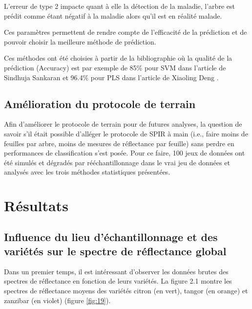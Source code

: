\documentclass[
  11pt,
  french,
  a4paper,
  extrafontsizes,onecolumn,openright
  ]{memoir}
\begin{document}
L'erreur de type 2 impacte quant à elle la détection de la maladie, l'arbre est prédit comme étant négatif à la maladie alors qu'il est en réalité malade.

Ces paramètres permettent de rendre compte de l'efficacité de la prédiction et de pouvoir choisir la meilleure méthode de prédiction.

Ces méthodes ont été choisies à partir de la bibliographie où la qualité de la prédiction (Accuracy) est par exemple de 85\% pour SVM dans l'article de Sindhuja Sankaran \autocite{sankaran_huanglongbing_2013} et 96.4\% pour PLS dans l'article de Xiaoling Deng \autocite{deng_detection_2020}.

\hypertarget{amuxe9lioration-du-protocole-de-terrain}{%
\section{Amélioration du protocole de terrain}\label{amuxe9lioration-du-protocole-de-terrain}}

Afin d'améliorer le protocole de terrain pour de futures analyses, la question de savoir s'il était possible d'alléger le protocole de SPIR à main (i.e., faire moins de feuilles par arbre, moins de mesures de réflectance par feuille) sans perdre en performances de classification s'est posée. Pour ce faire, 100 jeux de données ont été simulés et dégradés par rééchantillonnage dans le vrai jeu de données et analysés avec les trois méthodes statistiques présentées.

\hypertarget{ruxe9sultats}{%
\chapter{Résultats}\label{ruxe9sultats}}

\hypertarget{influence-du-lieu-duxe9chantillonnage-et-des-variuxe9tuxe9s-sur-le-spectre-de-ruxe9flectance-global}{%
\section{Influence du lieu d'échantillonnage et des variétés sur le spectre de réflectance global}\label{influence-du-lieu-duxe9chantillonnage-et-des-variuxe9tuxe9s-sur-le-spectre-de-ruxe9flectance-global}}

Dans un premier temps, il est intéressant d'observer les données brutes des spectres de réflectance en fonction de leurs variétés.
La figure 2.1 montre les spectres de réflectance moyens des variétés citron (en vert), tangor (en orange) et zanzibar (en violet) (figure \ref{fig:19}).
\end{document}

